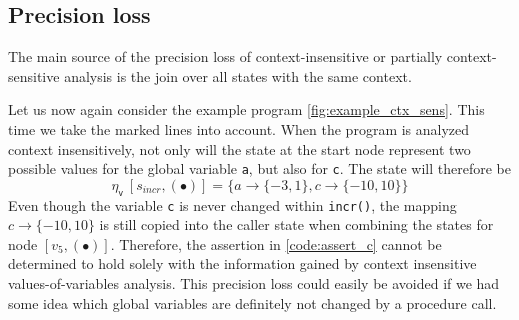     \subsection{Precision loss}\label{section:precisionLoss}
    The main source of the precision loss of context-insensitive or partially context-sensitive analysis is the join over all states with the same context. 

    Let us now again consider the example program \autoref{fig:example_ctx_sens}. This time we take the marked lines into account. When the program is analyzed context insensitively, not only will the state at the start node represent two possible values for the global variable \texttt{a}, but also for \texttt{c}. The state will therefore be 
    \[\eta_\textsf{v}\ [s_{incr}, (\bullet)] = \{a \rightarrow \{-3, 1\}, c \rightarrow \{-10, 10\}\} \]
    Even though the variable \texttt{c} is never changed within \texttt{incr()}, the mapping $c \rightarrow \{-10, 10\}$ is still copied into the caller state when combining the states for node $[v_5, (\bullet)]$. Therefore, the assertion in \autoref{code:assert_c} cannot be determined to hold solely with the information gained by context insensitive values-of-variables analysis. This precision loss could easily be avoided if we had some idea which global variables are definitely not changed by a procedure call.

